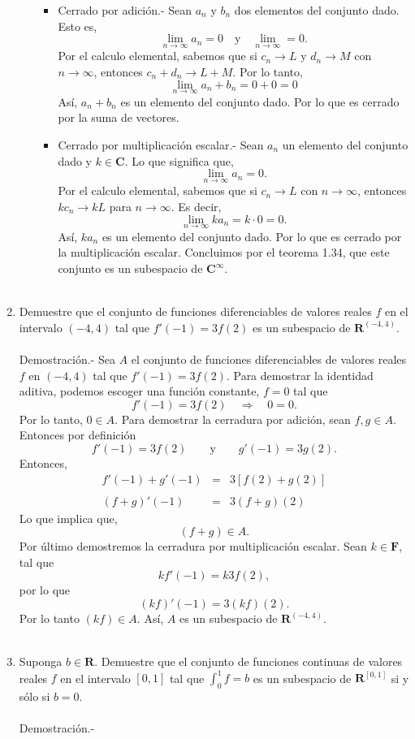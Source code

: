 \begin{enumerate}[\bfseries 1.]
\begin{enumerate}[(a)]
\begin{itemize}
		    \item Cerrado por adición.-\; Sean $a_n$ y $b_n$ dos elementos del conjunto dado. Esto es,
			$$\lim_{n\to \infty}a_n=0\quad \mbox{y}\quad \lim_{n\to \infty}=0.$$
		    Por el calculo elemental, sabemos que si $c_n\to L$ y $d_n\to M$ con $n\to \infty$, entonces $c_n+d_n\to L+M$. Por lo tanto,
		    $$\lim_{n\to \infty}a_n+b_n=0+0=0$$
		    Así, $a_n+b_n$ es un elemento del conjunto dado. Por lo que es cerrado por la suma de vectores.

		    \item Cerrado por multiplicación escalar.-\; Sean $a_n$ un elemento del conjunto dado y $k\in \textbf{C}$. Lo que significa que,
			$$\lim_{n\to \infty}a_n=0.$$
			Por el calculo elemental, sabemos que si $c_n\to L$ con $n\to \infty$, entonces $kc_n\to kL$ para $n\to \infty$. Es decir,
			$$\lim_{n\to \infty}ka_n = k\cdot 0 = 0.$$
			Así, $ka_n$ es un elemento del conjunto dado. Por lo que es cerrado por la multiplicación escalar. Concluimos por el teorema 1.34, que este conjunto es un subespacio de $\textbf{C}^{\infty}$.\\\\
		\end{itemize}

	\end{enumerate}

    \item Demuestre que el conjunto de funciones diferenciables de valores reales $f$ en el intervalo $(-4,4)$ tal que $f'(-1)=3f(2)$ es un subespacio de $\textbf{R}^{(-4,4)}$.\\\\
	Demostración.-\; Sea $A$ el conjunto de funciones diferenciables de valores reales $f$ en $(-4,4)$ tal que $f'(-1)=3f(2)$. Para demostrar la identidad aditiva, podemos escoger una función constante, $f=0$ tal que 
	$$f'(-1)=3f(2)\quad \Rightarrow \quad 0=0.$$
	Por lo tanto, $0\in A$. Para demostrar la cerradura por adición, sean $f,g\in A$. Entonces por definición 
	$$f'(-1)=3f(2)\qquad \mbox{y}\qquad g'(-1)=3g(2).$$
	Entonces, 
	$$\begin{array}{rcl}
	    f'(-1)+g'(-1) &=& 3\left[f(2)+g(2)\right]\\\\
	    (f+g)'(-1) &=& 3(f+g)(2)
	\end{array}$$
	Lo que implica que,
	$$(f+g)\in A.$$
	Por último demostremos la cerradura por multiplicación escalar. Sean  $k\in \textbf{F}$, tal que 
	$$kf'(-1)=k3f(2),$$
	por lo que 
	$$(kf)'(-1)=3(kf)(2).$$
	Por lo tanto $(kf)\in A$. Así, $A$ es un subespacio de $\textbf{R}^{(-4,4)}$.\\\\

    \item Suponga $b\in \textbf{R}$. Demuestre que el conjunto de funciones continuas de valores reales $f$ en el intervalo $[0,1]$ tal que $\int_0^1 f = b$ es un subespacio de $\textbf{R}^{[0,1]}$ si y sólo si $b=0$.\\\\
	Demostración.-\; 

\end{enumerate}


